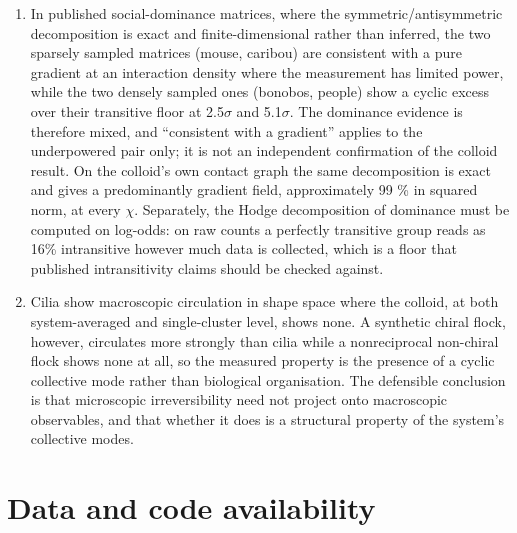 \documentclass[aps,pre,preprint,superscriptaddress,nofootinbib,longbibliography]{revtex4-2}
\begin{document}
\begin{enumerate}
\item In published social-dominance matrices, where the symmetric/antisymmetric decomposition is exact and finite-dimensional rather than inferred, the two sparsely sampled matrices (mouse, caribou) are consistent with a pure gradient at an interaction density where the measurement has limited power, while the two densely sampled ones (bonobos, people) show a cyclic excess over their transitive floor at 2.5$\sigma$ and 5.1$\sigma$. The dominance evidence is therefore mixed, and ``consistent with a gradient'' applies to the underpowered pair only; it is not an independent confirmation of the colloid result. On the colloid's own contact graph the same decomposition is exact and gives a predominantly gradient field, approximately 99 \% in squared norm, at every $\chi$. Separately, the Hodge decomposition of dominance must be computed on log-odds: on raw counts a perfectly transitive group reads as 16\% intransitive however much data is collected, which is a floor that published intransitivity claims should be checked against.
\item Cilia show macroscopic circulation in shape space where the colloid, at both system-averaged and single-cluster level, shows none. A synthetic chiral flock, however, circulates more strongly than cilia while a nonreciprocal non-chiral flock shows none at all, so the measured property is the presence of a cyclic collective mode rather than biological organisation. The defensible conclusion is that microscopic irreversibility need not project onto macroscopic observables, and that whether it does is a structural property of the system's collective modes.
\end{enumerate}

\section{Data and code availability}
\end{document}
